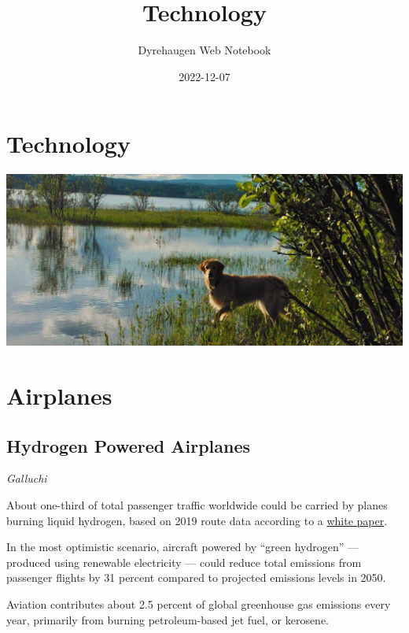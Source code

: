 \documentclass[
]{book}
\title{Technology}
\author{Dyrehaugen Web Notebook}
\date{2022-12-07}
\begin{document}
\maketitle

{
\setcounter{tocdepth}{1}
\tableofcontents
}
\hypertarget{technology}{%
\chapter{Technology}\label{technology}}

\includegraphics{fig/zelda.jpg}

\hypertarget{airplanes}{%
\chapter{Airplanes}\label{airplanes}}

\hypertarget{hydrogen-powered-airplanes}{%
\section{Hydrogen Powered Airplanes}\label{hydrogen-powered-airplanes}}

\emph{Galluchi}

About one-third of total passenger traffic worldwide could be carried by planes burning liquid hydrogen, based on 2019 route data according to a \href{https://theicct.org/publication/aviation-global-evo-hydrogen-aircraft-jan22}{white paper}.

In the most optimistic scenario, aircraft powered by \hspace{0pt}``green hydrogen'' --- produced using renewable electricity --- could reduce total emissions from passenger flights by 31 percent compared to projected emissions levels in 2050.

Aviation contributes about 2.5 percent of global greenhouse gas emissions every year, primarily from burning petroleum-based jet fuel, or kerosene.
\end{document}
